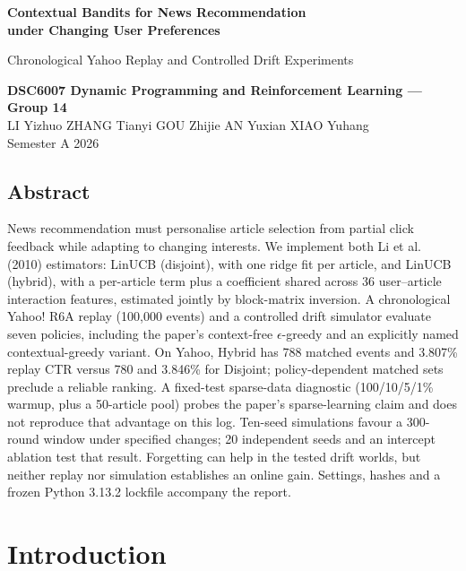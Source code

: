 \documentclass[10pt,a4paper]{article}
\begin{document}
\begin{center}
{\Large\bfseries Contextual Bandits for News Recommendation\\under Changing User Preferences}\par\vspace{6pt}
{\large Chronological Yahoo Replay and Controlled Drift Experiments}\par\vspace{5pt}
\textbf{DSC6007 Dynamic Programming and Reinforcement Learning --- Group 14}\\
LI Yizhuo \quad ZHANG Tianyi \quad GOU Zhijie \quad AN Yuxian \quad XIAO Yuhang\\
Semester A 2026
\end{center}

\subsection*{Abstract}
News recommendation must personalise article selection from partial click
feedback while adapting to changing interests. We implement both Li et al.
(2010) estimators: LinUCB (disjoint), with one ridge fit per article, and
LinUCB (hybrid), with a per-article term plus a coefficient shared across
36 user--article interaction features, estimated jointly by block-matrix
inversion. A chronological Yahoo! R6A replay (100,000 events) and a
controlled drift simulator evaluate seven policies, including the paper's
context-free $\epsilon$-greedy and an explicitly named contextual-greedy
variant. On Yahoo, Hybrid has 788 matched events and 3.807\% replay CTR
versus 780 and 3.846\% for Disjoint; policy-dependent matched sets preclude
a reliable ranking. A fixed-test sparse-data diagnostic (100/10/5/1\%
warmup, plus a 50-article pool) probes the paper's sparse-learning claim and
does not reproduce that advantage on this log.
Ten-seed simulations favour a 300-round window under specified changes;
20 independent seeds and an intercept ablation test that result. Forgetting
can help in the tested drift worlds, but neither replay nor simulation
establishes an online gain. Settings, hashes and a frozen Python 3.13.2
lockfile accompany the report.

\section{Introduction}
\end{document}
